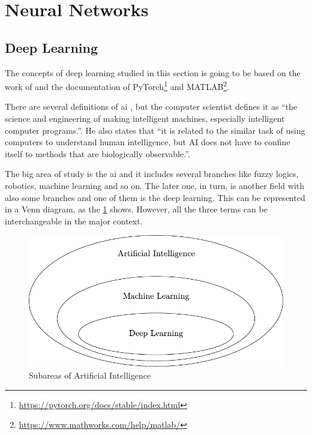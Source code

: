 \section{Neural Networks}

\subsection{Deep Learning}

The concepts of deep learning studied in this section is going to be based on the work of \citet{goodfellow2016} and the documentation of PyTorch\footnote{\url{https://pytorch.org/docs/stable/index.html}} and MATLAB\footnote{\url{https://www.mathworks.com/help/matlab/}}.

There are several definitions of \gls*{ai} \citep{winston1992}, but the  computer scientist \citet{mccarthy2007} defines it as ``the science and engineering of making intelligent machines, especially intelligent computer programs.''.
He also states that ``it is related to the similar task of using computers to understand human intelligence, but AI does not have to confine itself to methods that are biologically observable.''.

The big area of study is the \gls*{ai} and it includes several branches like fuzzy logics, robotics, machine learning and so on. 
The later one, in turn, is another field with also some branches and one of them is the deep learning.
This can be represented in a Venn diagram, as the \cref{fig:venn_dl} shows.
However, all the three terms can be interchangeable in the major context.

\begin{figure}[!htb]
    \centering
    \includegraphics{figures/3review/nn/venn_dl.pdf}
    \caption{Subareas of Artificial Intelligence}
    \label{fig:venn_dl}
\end{figure}

